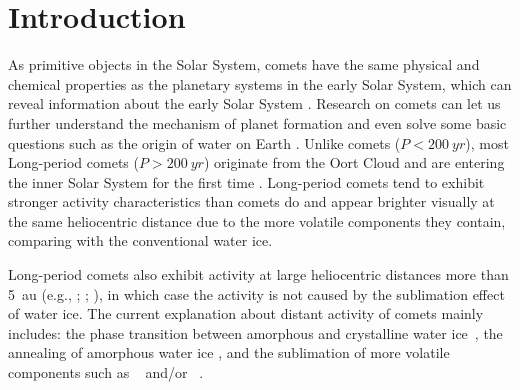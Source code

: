 \section{Introduction}

As primitive objects in the Solar System, comets have the same physical and chemical properties as the planetary systems in the early Solar System, which can reveal information about the early Solar System \citep{mazzotta_epifani_distant_2009, solontoi_ensemble_2012}. Research on comets can let us further understand the mechanism of planet formation and even solve some basic questions such as the origin of water on Earth \citep{alexander_water_2018}. Unlike  comets ($P<\qty{200}{yr}$), most Long-period comets ($P>\qty{200}{yr}$) originate from the Oort Cloud and are entering the inner Solar System for the first time \citep{jewittCOLORSYSTEMATICSCOMETS2015}. Long-period comets tend to exhibit stronger activity characteristics than  comets do and appear brighter visually at the same heliocentric distance due to the more volatile components they contain, comparing with the conventional water ice. 

Long-period comets also exhibit activity at large heliocentric distances more than {\qty{5}{\astronomicalunit}} (e.g., \citealt{mazzotta_epifani_distant_2009, mazzotta_epifani_activity_2010}; \citealt{meech_activity_2009}; \citealt{ivanova_quasi-simultaneous_2023}), in which case the activity is not caused by the sublimation effect of water ice. The current explanation about distant activity of comets mainly includes: the phase transition between amorphous and crystalline water ice~\citep{prialnik_crystallization_1992, capria_c1995_2002}, the annealing of amorphous water ice \citep{meech_activity_2009}, and the sublimation of more volatile components such as ~\citep{ootsubo_akari_2012} and/or ~\citep{jewitt_distant_2019}. 

